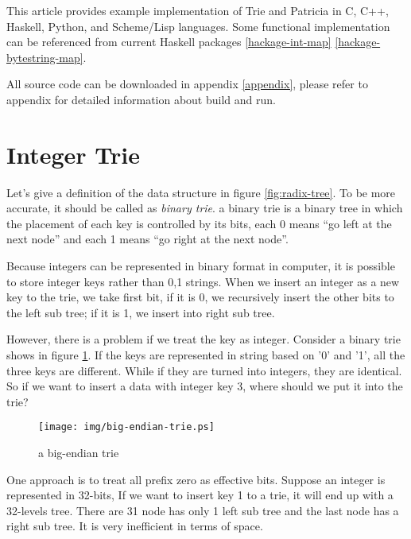 \documentclass{article}
\begin{document}
This article provides example implementation of Trie and Patricia 
in C, C++, Haskell, Python, and Scheme/Lisp languages. Some functional
implementation can be referenced from current Haskell packages \ref{hackage-int-map} 
\ref{hackage-bytestring-map}.

All source code can be downloaded in appendix \ref{appendix}, please 
refer to appendix for detailed information about build and run.

\section{Integer Trie}
\label{int-trie}

Let's give a definition of the data structure in figure \ref{fig:radix-tree}.
To be more accurate, it should be called as \emph{binary trie}. a binary
trie is a binary tree in which the placement of each key is controlled by
its bits, each 0 means ``go left at the next node'' and each 1 means ``go
right at the next node''\cite{okasaki-int-map}.

Because integers can be represented in binary format in computer, it is 
possible to store integer keys rather than 0,1 strings. When we insert an
integer as a new key to the trie, we take first bit, if it is 0, we recursively
insert the other bits to the left sub tree; if it is 1, we insert into right
sub tree.

However, there is a problem if we treat the key as integer. Consider a binary
trie shows in figure \ref{fig:big-endian-trie}. If the keys are represented in 
string based on '0' and '1', all the three keys are different. While if they are
turned into integers, they are identical. So if we want to insert a data with integer
key 3, where should we put it into the trie?

\begin{figure}[htbp]
       \begin{center}
	\texttt{[image: img/big-endian-trie.ps]}
        \caption{a big-endian trie} \label{fig:big-endian-trie}
       \end{center}
\end{figure}

One approach is to treat all prefix zero as effective bits.
Suppose an integer is represented in 32-bits, If we want to insert key 1 to a trie, 
it will end up with a 32-levels tree. 
There are 31 node has only 1 left sub tree and the last node has
a right sub tree. It is very inefficient in terms of space.
\end{document}
